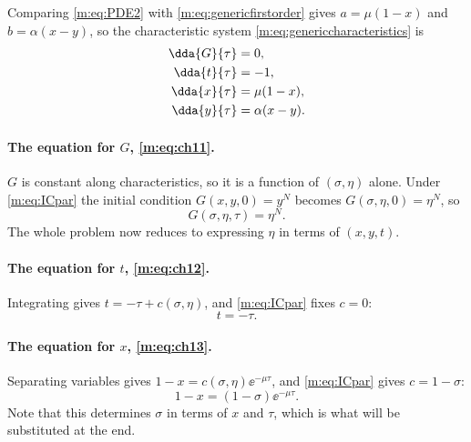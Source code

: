 Comparing \cref{m:eq:PDE2} with \cref{m:eq:genericfirstorder} gives
$a = \mu(1-x)$ and $b = \alpha(x-y)$, so the characteristic system
\cref{m:eq:genericcharacteristics} is
\begin{align}
\dda{G}{\tau} &= 0, \label{m:eq:ch11}\\
\dda{t}{\tau} &= -1, \label{m:eq:ch12}\\
\dda{x}{\tau} &= \mu(1-x), \label{m:eq:ch13}\\
\dda{y}{\tau} &= \alpha(x-y). \label{m:eq:ch14}
\end{align}

\paragraph{The equation for $G$, \eqref{m:eq:ch11}.}
$G$ is constant along characteristics, so it is a function of $(\sigma,\eta)$
alone. Under \cref{m:eq:ICpar} the initial condition $G(x,y,0)=y^N$ becomes
$G(\sigma,\eta,0)=\eta^N$, so
\begin{equation}
\label{m:eq:GetaN}
G(\sigma,\eta,\tau) = \eta^N .
\end{equation}
The whole problem now reduces to expressing $\eta$ in terms of $(x,y,t)$.

\paragraph{The equation for $t$, \eqref{m:eq:ch12}.}
Integrating gives $t=-\tau+c(\sigma,\eta)$, and \cref{m:eq:ICpar} fixes $c=0$:
\begin{equation}
\label{m:eq:minustau}
t = -\tau .
\end{equation}

\paragraph{The equation for $x$, \eqref{m:eq:ch13}.}
Separating variables gives $1-x = c(\sigma,\eta)\ee^{-\mu\tau}$, and
\cref{m:eq:ICpar} gives $c=1-\sigma$:
\begin{equation}
\label{m:eq:sandxwithtau}
1-x = (1-\sigma)\ee^{-\mu\tau} .
\end{equation}
Note that this determines $\sigma$ in terms of $x$ and $\tau$, which is what will
be substituted at the end.

